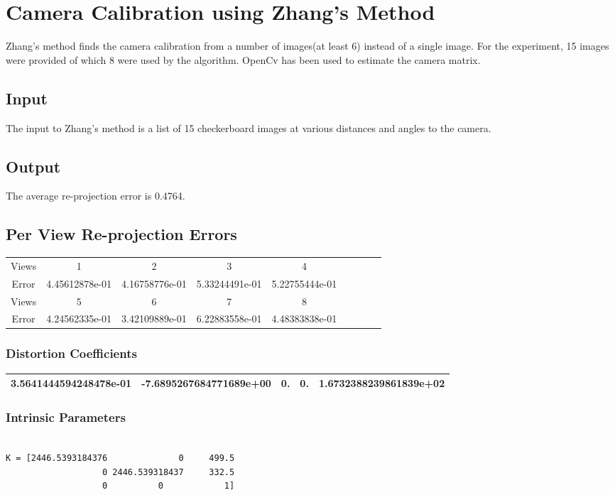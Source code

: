 \documentclass[12pt]{article}
\begin{document}
\section{Camera Calibration using Zhang's Method}
Zhang's method finds the camera calibration from a number of images(at least 6) instead of a single image. For the experiment, 15 images were provided of which 8 were used by the algorithm. OpenCv has been used to estimate the camera matrix.

\subsection{Input}
The input to Zhang's method is a list of 15 checkerboard images at various distances and angles to the camera.

\subsection{Output}
The average re-projection error is 0.4764.

\subsection{Per View Re-projection Errors}
\begin{tabular}{|c|c|c|c|c|c|c|c|c|}
\hline
Views & 1 & 2 & 3 & 4\\
Error & 4.45612878e-01 & 4.16758776e-01 & 5.33244491e-01 & 5.22755444e-01 \\
\hline
Views & 5 & 6 & 7 & 8 \\
Error & 4.24562335e-01 & 3.42109889e-01 & 6.22883558e-01 & 4.48383838e-01 \\
\hline
\end{tabular}

\subsubsection{Distortion Coefficients}
\begin{tabular}{|c|c|c|c|c|}
\hline
3.5641444594248478e-01 & -7.6895267684771689e+00 & 0. & 0. &
    1.6732388239861839e+02 \\
    \hline
\end{tabular}
\subsubsection{Intrinsic Parameters}

\begin{lstlisting}
       
K = [2446.5393184376              0     499.5 
                   0 2446.539318437     332.5 
                   0          0            1]
\end{lstlisting}
\end{document}
